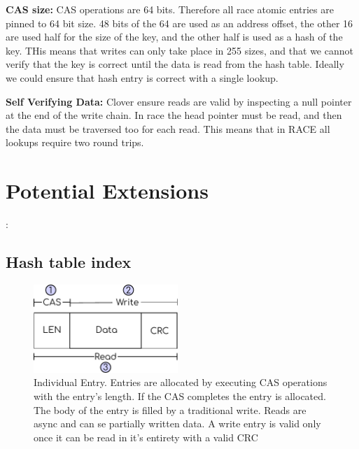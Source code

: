 \textbf{CAS size:} CAS operations are 64 bits. Therefore all race atomic entries
are pinned to 64 bit size. 48 bits of the 64 are used as an address offset, the
other 16 are used half for the size of the key, and the other half is used as a
hash of the key. THis means that writes can only take place in 255 sizes, and
that we cannot verify that the key is correct until the data is read from the
hash table. Ideally we could ensure that hash entry is correct with a single lookup.

\textbf{Self Verifying Data:} Clover ensure reads are valid by inspecting a null
pointer at the end of the write chain. In race the head pointer must be read,
and then the data must be traversed too for each read. This means that in RACE
all lookups require two round trips.

\section{Potential Extensions}:

\subsection{Hash table index}

\begin{figure}[t] \includegraphics[width=0.485\textwidth]{fig/WriteBufEntry.pdf}
\caption{Individual Entry. Entries are allocated by executing CAS operations
with the entry's length. If the CAS completes the entry is allocated. The body
of the entry is filled by a traditional write. Reads are async and can se
partially written data. A write entry is valid only once it can be read in it's
entirety with a valid CRC}

\label{fig:cas_vs_swap}
\end{figure}

